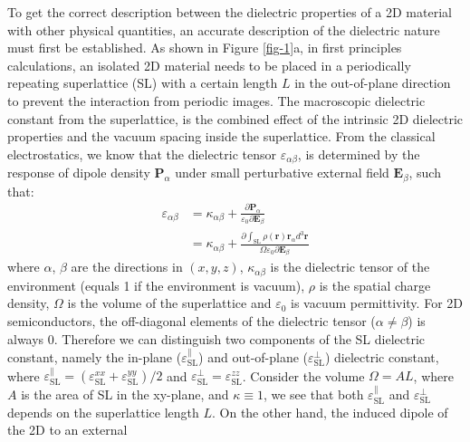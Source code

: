 \documentclass[journal=ancac3,manuscript=article,email=true,hyperref=true,keywords=false]{achemso}
\begin{document}
To get the correct description between the dielectric properties of a
2D material with other physical quantities, an accurate description of
the dielectric nature must first be established. As shown in Figure
\ref{fig-1}a, in first principles calculations, an isolated 2D
material needs to be placed in a periodically repeating superlattice
(SL) with a certain length $L$ in the out-of-plane direction to
prevent the interaction from periodic images. The macroscopic
dielectric constant from the superlattice, is the combined effect of
the intrinsic 2D dielectric properties and the vacuum spacing inside
the superlattice. From the classical electrostatics, we know that the
dielectric tensor $\varepsilon_{\alpha \beta}$, is determined by the
response of dipole density $\mathbf{P}_{\alpha}$ under small
perturbative external field $\mathbf{E}_{\beta}$, such that:
\begin{equation}
  \label{eq:def-eps}
  \begin{aligned}
    \varepsilon_{\alpha \beta} &= \kappa_{\alpha \beta} +
    \frac{\partial \mathbf{P}_{\alpha}}{\varepsilon_{0} \partial \mathbf{E}_{\beta}} \\
    &= \kappa_{\alpha \beta} + {\displaystyle \frac{\partial {\displaystyle
          \int_{\mathrm{SL}} \rho(\mathbf{r})\mathbf{r}_{\alpha} d^{3}\mathbf{r}}}{\Omega \varepsilon_{0} \partial \mathbf{E}_{\beta}}}
  \end{aligned}
\end{equation}
where $\alpha$, $\beta$ are the directions in $(x, y, z)$,
$\kappa_{\alpha\beta}$ is the dielectric tensor of the environment
(equals 1 if the environment is vacuum), $\rho$ is the spatial charge
density, $\Omega$ is the volume of the superlattice and
$\varepsilon_{0}$ is vacuum permittivity. For 2D semiconductors, the
off-diagonal elements of the dielectric tensor ($\alpha \neq \beta$)
is always 0. Therefore we can distinguish two components of the
SL dielectric constant, namely the in-plane
($\varepsilon_{\mathrm{SL}}^{\parallel}$) and out-of-plane
($\varepsilon_{\mathrm{SL}}^{\perp}$) dielectric constant, where
$\varepsilon_{\mathrm{SL}}^{\parallel} =
(\varepsilon_{\mathrm{SL}}^{xx} + \varepsilon_{\mathrm{SL}}^{yy})/2$
and
$\varepsilon_{\mathrm{SL}}^{\perp} =
\varepsilon_{\mathrm{SL}}^{zz}$. Consider the volume $\Omega=AL$,
where $A$ is the area of SL in the xy-plane, and $\kappa \equiv 1$, we
see that both $\varepsilon^{\parallel}_{\mathrm{SL}}$ and
$\varepsilon^{\perp}_{\mathrm{SL}}$ depends on the superlattice length
$L$. On the other hand, the induced dipole of the 2D to an external
\end{document}
